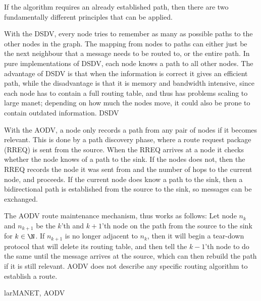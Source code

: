 If the algorithm requires an already established path, then there are two fundamentally different principles that can be applied.
\begin{description}
{With the DSDV, every node tries to remember as many as possible paths to the other nodes in the graph. The mapping from nodes to paths can either just be the next neighbour that a message needs to be routed to, or the entire path. In pure implementations of DSDV, each node knows a path to all other nodes. The advantage of DSDV is that when the information is correct it gives an efficient path, while the disadvantage is that it is memory and bandwidth intensive, since each node has to contain a full routing table, and thus has problems scaling to large \ac{manet}; depending on how much the nodes move, it could also be prone to contain outdated information.
}
{DSDV}

{With the AODV, a node only records a path from any pair of nodes if it becomes relevant. This is done by a path discovery phase, where a route request package (RREQ) is sent from the source. When the RREQ arrives at a node it checks whether the node knows of a path to the sink. If the nodes does not, then the RREQ records the node it was sent from and the number of hops to the current node, and proceeds. If the current node does know a path to the sink, then a bidirectional path is established from the source to the sink, so messages can be exchanged.

The AODV route maintenance mechanism, thus works as follows: 
Let node $n_k$ and $n_{k+1}$ be the $k$'th and $k+1$'th node on the path from the source to the sink for $k \in \N$. If $n_{k+1}$ is no longer adjacent to $n_{k}$, then it will begin a tear-down protocol that will delete its routing table, and then tell the $k-1$'th node to do the same until the message arrives at the source, which can then rebuild the path if it is still relevant.
AODV does not describe any specific routing algorithm to establish a route.}
{larMANET, AODV}
\end{description}

